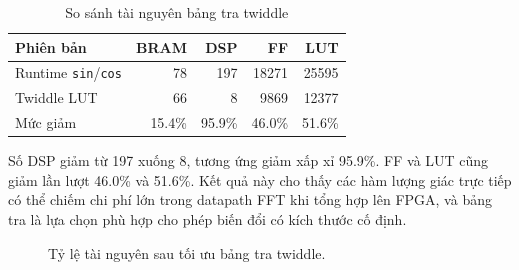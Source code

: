 ﻿\documentclass[conference]{IEEEtran}
\begin{document}
\begin{table}[htbp]
    \caption{So sánh tài nguyên bảng tra twiddle}
    \centering
    \label{tab:twiddle}
    \begin{tabular}{lrrrr}
        \toprule
        \textbf{Phiên bản}                & \textbf{BRAM} & \textbf{DSP} & \textbf{FF} & \textbf{LUT} \\
        \midrule
        Runtime \texttt{sin}/\texttt{cos} & 78            & 197          & 18271       & 25595        \\
        Twiddle LUT                       & 66            & 8            & 9869        & 12377        \\
        Mức giảm                          & 15.4\%        & 95.9\%       & 46.0\%      & 51.6\%       \\
        \bottomrule
    \end{tabular}
\end{table}

Số DSP giảm từ 197 xuống 8, tương ứng giảm xấp xỉ 95.9\%. FF và LUT cũng giảm lần lượt 46.0\% và 51.6\%. Kết quả này cho thấy các hàm lượng giác trực tiếp có thể chiếm chi phí lớn trong datapath FFT khi tổng hợp lên FPGA, và bảng tra là lựa chọn phù hợp cho phép biến đổi có kích thước cố định.

\begin{figure}[htbp]
    \centering
    \caption{Tỷ lệ tài nguyên sau tối ưu bảng tra twiddle.}
    \label{fig:twiddle_resource_chart}
\end{figure}
\end{document}

